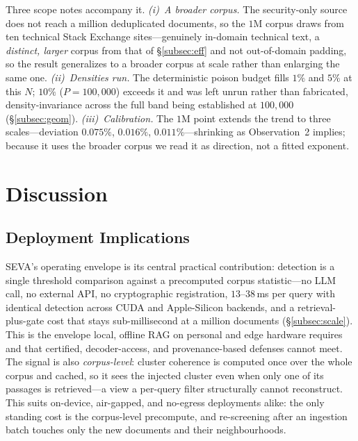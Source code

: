 \documentclass[10pt,journal,compsoc]{IEEEtran}
\begin{document}
Three scope notes accompany it. \emph{(i)~A broader corpus.} The security-only source does not
reach a million deduplicated documents, so the $1$M corpus draws from ten technical Stack
Exchange sites---genuinely in-domain technical text, a \emph{distinct, larger} corpus from that
of \S\ref{subsec:eff} and not out-of-domain padding, so the result generalizes to a broader
corpus at scale rather than enlarging the same one. \emph{(ii)~Densities run.} The deterministic
poison budget fills $1\%$ and $5\%$ at this $N$; $10\%$ ($P=100{,}000$) exceeds it and was left
unrun rather than fabricated, density-invariance across the full band being established at
$100{,}000$ (\S\ref{subsec:geom}). \emph{(iii)~Calibration.} The $1$M point extends the trend to
three scales---deviation $0.075\%$, $0.016\%$, $0.011\%$---shrinking as Observation~2 implies;
because it uses the broader corpus we read it as direction, not a fitted exponent.

\section{Discussion}

\subsection{Deployment Implications}
SEVA's operating envelope is its central practical contribution: detection is a single
threshold comparison against a precomputed corpus statistic---no LLM call, no external API, no
cryptographic registration, $13$--$38$\,ms per query with identical detection across CUDA and
Apple-Silicon backends, and a retrieval-plus-gate cost that stays sub-millisecond at a million
documents (\S\ref{subsec:scale}). This is the envelope local, offline RAG on personal and edge
hardware requires and that certified, decoder-access, and provenance-based defenses cannot
meet. The signal is also \emph{corpus-level}: cluster coherence is computed once over the whole
corpus and cached, so it sees the injected cluster even when only one of its passages is
retrieved---a view a per-query filter structurally cannot reconstruct. This suits on-device,
air-gapped, and no-egress deployments alike: the only standing cost is the corpus-level
precompute, and re-screening after an ingestion batch touches only the new documents and their
neighbourhoods.
\end{document}

